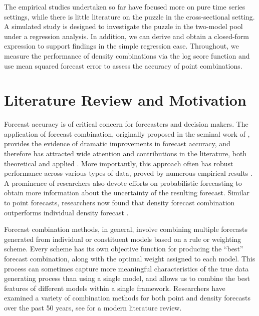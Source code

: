 \documentclass{monashthesis}
\begin{document}
The empirical studies undertaken so far have focused more on pure time series settings, while there is little literature on the puzzle in the cross-sectional setting. A simulated study is designed to investigate the puzzle in the two-model pool under a regression analysis. In addition, we can derive and obtain a closed-form expression to support findings in the simple regression case. Throughout, we measure the performance of density combinations via the log score function and use mean squared forecast error to assess the accuracy of point combinations.

\hypertarget{literature-review-and-motivation}{%
\section{Literature Review and Motivation}\label{literature-review-and-motivation}}

Forecast accuracy is of critical concern for forecasters and decision makers. The application of forecast combination, originally proposed in the seminal work of \textcite{BG69}, provides the evidence of dramatic improvements in forecast accuracy, and therefore has attracted wide attention and contributions in the literature, both theoretical and applied \autocite{C89,T06}. More importantly, this approach often has robust performance across various types of data, proved by numerous empirical results \autocite{GA11}. A prominence of researchers also devote efforts on probabilistic forecasting to obtain more information about the uncertainty of the resulting forecast. Similar to point forecasts, researchers now found that density forecast combination outperforms individual density forecast \autocites[e.g.,][]{HM07,GA11}.

Forecast combination methods, in general, involve combining multiple forecasts generated from individual or constituent models based on a rule or weighting scheme. Every scheme has its own objective function for producing the ``best'' forecast combination, along with the optimal weight assigned to each model. This process can sometimes capture more meaningful characteristics of the true data generating process than using a single model, and allows us to combine the best features of different models within a single framework. Researchers have examined a variety of combination methods for both point and density forecasts over the past 50 years, see \textcite{WHLK22} for a modern literature review.
\end{document}

